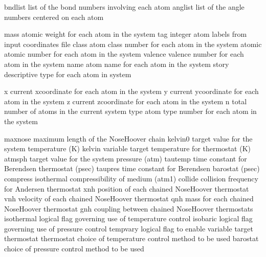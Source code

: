 \documentclass[letterpaper,11pt,english]{sphinxmanual}
\begin{document}

\begin{sphinxVerbatim}[commandchars=\\\{\}]
bndlist         list of the bond numbers involving each atom
anglist         list of the angle numbers centered on each atom
\end{sphinxVerbatim}


\begin{sphinxVerbatim}[commandchars=\\\{\}]
mass            atomic weight for each atom in the system
tag             integer atom labels from input coordinates file
class           atom class number for each atom in the system
atomic          atomic number for each atom in the system
valence         valence number for each atom in the system
name            atom name for each atom in the system
story           descriptive type for each atom in system
\end{sphinxVerbatim}


\begin{sphinxVerbatim}[commandchars=\\\{\}]
x               current x\PYGZhy{}coordinate for each atom in the system
y               current y\PYGZhy{}coordinate for each atom in the system
z               current z\PYGZhy{}coordinate for each atom in the system
n               total number of atoms in the current system
type            atom type number for each atom in the system
\end{sphinxVerbatim}


\begin{sphinxVerbatim}[commandchars=\\\{\}]
maxnose         maximum length of the Nose\PYGZhy{}Hoover chain
kelvin0         target value for the system temperature (K)
kelvin          variable target temperature for thermostat (K)
atmsph          target value for the system pressure (atm)
tautemp         time constant for Berendsen thermostat (psec)
taupres         time constant for Berendsen barostat (psec)
compress        isothermal compressibility of medium (atm\PYGZhy{}1)
collide         collision frequency for Andersen thermostat
xnh             position of each chained Nose\PYGZhy{}Hoover thermostat
vnh             velocity of each chained Nose\PYGZhy{}Hoover thermostat
qnh             mass for each chained Nose\PYGZhy{}Hoover thermostat
gnh             coupling between chained Nose\PYGZhy{}Hoover thermostats
isothermal      logical flag governing use of temperature control
isobaric        logical flag governing use of pressure control
tempvary        logical flag to enable variable target thermostat
thermostat      choice of temperature control method to be used
barostat        choice of pressure control method to be used
\end{sphinxVerbatim}
\end{document}
